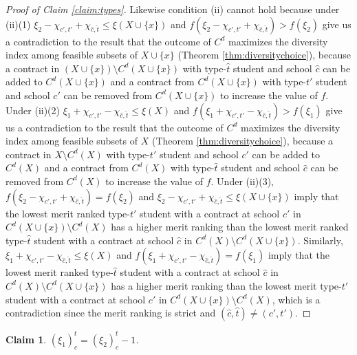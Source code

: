 \documentclass[12pt]{amsart}
\newtheorem{claim}{Claim}
\theoremstyle{remark}
\begin{document}
\begin{proof}[Proof of Claim \ref{claim:types}]
Likewise condition (ii) cannot hold because under (ii)(1) $\xi_2-\chi_{c',t'}+\chi_{\hat c, \hat t} \leq \xi(X\cup \{x\})$ and $f(\xi_2-\chi_{c',t'}+\chi_{\hat c, \hat t}) > f(\xi_2)$ give us a contradiction to the result that the outcome of $C^d$ maximizes the diversity index among feasible subsets of $X\cup \{x\}$
(Theorem \ref{thm:diversitychoice}), because a contract in $(X\cup\{x\}) \setminus C^d(X\cup\{x\})$ with
type-$\hat t$ student and school $\hat c$ can be added to $C^d(X\cup\{x\})$ and a contract from
$C^d(X\cup\{x\})$ with type-$t'$ student and school $c'$ can be removed from $C^d(X\cup\{x\})$ to increase the value of $f$.
Under (ii)(2) $\xi_1+\chi_{c',t'}-\chi_{\hat c, \hat t} \leq \xi(X)$ and $f(\xi_1+\chi_{c',t'}-\chi_{\hat c, \hat t}) > f(\xi_1)$ give us a contradiction to the result that the outcome of $C^d$ maximizes the diversity index among feasible subsets of $X$
(Theorem \ref{thm:diversitychoice}), because a contract in $X\setminus C^d(X)$ with type-$t'$ student and
school $c'$ can be added to $C^d(X)$ and a contract from $C^d(X)$ with type-$\hat t$ student and
school $\hat c$ can be removed from $C^d(X)$ to increase the value of $f$.
Under (ii)(3), $f(\xi_2-\chi_{c',t'}+\chi_{\hat c, \hat t}) = f(\xi_2)$ and $\xi_2-\chi_{c',t'}+\chi_{\hat c, \hat t} \leq \xi(X\cup\{x\})$ imply that the lowest merit ranked type-$t'$ student with a contract at school $c'$ in $C^d(X\cup \{x\})\setminus C^d(X)$ has a higher merit ranking than the lowest merit ranked type-$\hat t$ student with a contract at school $\hat c$ in
$C^d(X) \setminus C^d(X\cup \{x\})$. Similarly, $\xi_1+\chi_{c',t'}-\chi_{\hat c, \hat t}\leq \xi(X)$ and $f(\xi_1+\chi_{c',t'}-\chi_{\hat c, \hat t}) = f(\xi_1)$
imply that the lowest merit ranked type-$\hat t$ student with a contract
at school $\hat{c}$ in $C^d(X)\setminus C^d(X\cup \{x\})$ has a higher
merit ranking than the lowest merit type-$t'$ student with a contract at school $c'$ in $C^d(X\cup \{x\}) \setminus C^d(X)$, which is a contradiction since the merit
ranking is strict and $(\hat c, \hat t)\neq (c', t')$.
\end{proof}



\begin{claim}\label{claim:comparetc}
$(\xi_1)^t_c=(\xi_2)^t_c-1$.
\end{claim}
\end{document}
